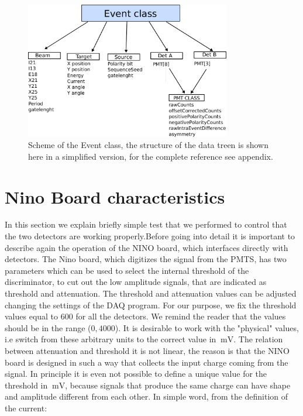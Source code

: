 \begin{figure}[hbtp]
\centering
\includegraphics[width = 0.8\textwidth]{Analysis/EventClass.pdf}
\caption{Scheme of the Event class, the structure of the data treen is shown here in a simplified version, for the complete reference see appendix.}
\end{figure}

\section{Nino Board characteristics}
In this section we explain briefly simple test that we performed to control that the two detectors are working properly.Before going into detail it is important to describe again the operation of the NINO board, which interfaces directly with detectors.
The Nino board, which digitizes the signal from the PMTS, has two parameters which can be used to select the internal threshold of the discriminator, to cut out the low amplitude signals, that are indicated as threshold and attenuation. The threshold and attenuation values can be adjusted changing the settings of the DAQ program.
For our purpose, we fix the threshold values equal to $600$ for all the detectors. We remind the reader that the values should be in the range ($0,4000$). 
It is desirable to work with the "physical" values, i.e switch from these arbitrary units to the correct value in $\SI{}{\milli \volt}$. The relation between attenuation and threshold it is not linear, the reason is that the NINO board is designed in such a way that collects the input charge coming from the signal. In principle it is even not possible to define a unique value for the threshold in $\SI{}{\milli \volt}$, because signals that produce the same charge can have shape and amplitude different from each other. In simple word, from the definition of the current:

